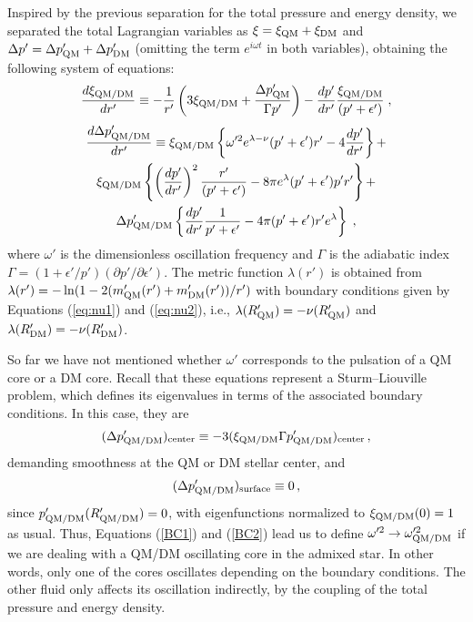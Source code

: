 \documentclass[universe,article,accept,moreauthors,pdftex]{Definitions/mdpi}
\begin{document}
Inspired by the previous separation for the total pressure and energy density, we separated the total Lagrangian variables as $\xi=\xi_{\rm QM}+\xi_{\rm DM}$ and $\Delta{p'}=\Delta{p'_{\rm QM}}+\Delta{p'_{\rm DM}}$ (omitting the term ${e}^{i\omega{t}}$ in both variables), obtaining the following system of equations:
	\begin{equation}
	\frac{d\xi_{\rm QM/DM}}{dr'}\equiv-\frac{1}{r'}\left(3\xi_{\rm QM/DM}+\frac{\Delta{p'_{\rm QM}}}{\Gamma{p'}}\right)-\frac{dp'}{dr'}\frac{\xi_{\rm QM/DM}}{(p'+\epsilon')} \; ,
	\label{Rad1}
	\end{equation}
	\begin{multline}
	\frac{d\Delta{p'_{\rm QM/DM}}}{dr'}\equiv\xi_{\rm QM/DM}\left\lbrace{\omega'^{2}e^{\lambda-\nu}(p'+\epsilon')r'-4\frac{dp'}{dr'}}\right\rbrace+ \\
	\xi_{\rm QM/DM}\left\lbrace\left(\frac{dp'}{dr'}\right)^{2}\frac{r'}{(p'+\epsilon')}-8\pi{e^{\lambda}}(p'+\epsilon')p'r'\right\rbrace + \\
	\Delta{p'_{\rm QM/DM}}\left\lbrace{\frac{dp'}{dr'}\frac{1}{p'+\epsilon'}-4\pi(p'+\epsilon')r'{e}^{\lambda}}\right\rbrace \; ,
	\label{Rad2}
	\end{multline}	
where $\omega'$ is the dimensionless oscillation frequency and $\Gamma$ is the adiabatic index \linebreak $\Gamma=(1+\epsilon'/p')(\partial{p'}/\partial{\epsilon'})$. The metric function $\lambda(r')$ is obtained from $\lambda(r')=-\ln(1-2(m'_{\rm QM}(r')+m'_{\rm DM}(r'))/r')$ with boundary conditions given by Equations (\ref{eq:nu1}) and (\ref{eq:nu2}), i.e., $\lambda(R'_{\rm QM})=-\nu(R'_{\rm QM})$ and $\lambda(R'_{\rm DM})=-\nu(R'_{\rm DM})$.

So far we have not mentioned whether $\omega'$ corresponds to the pulsation of a QM core or a DM core. Recall that these equations represent a Sturm--Liouville problem, which defines its eigenvalues in terms of the associated boundary conditions. In this case, they are 
%
\begin{equation}
	(\Delta{p'_{\rm QM/DM}})_{\rm center}\equiv-3(\xi_{\rm QM/DM}\Gamma{p'_{\rm QM/DM}})_{\rm center} \, ,
\label{BC1}
\end{equation}
%
demanding smoothness at the QM or DM stellar center, and 
%
\begin{equation}
	(\Delta{p'_{\rm QM/DM}})_{\rm surface}\equiv{0} \, ,
\label{BC2}
\end{equation}
%
since $p'_{\rm QM/DM}(R'_{\rm QM/DM})=0$, with eigenfunctions normalized to $\xi_{\rm QM/DM}(0)=1$ as usual. Thus, Equations (\ref{BC1}) and (\ref{BC2}) lead us to define $\omega'^{2}\to\omega'^{2}_{\rm QM/DM}$ if we are dealing with a QM/DM oscillating core in the admixed star. In other words, only one of the cores oscillates depending on the boundary conditions. The other fluid only affects its oscillation indirectly, by the coupling of %
 the total pressure and energy density. 
\end{document}
